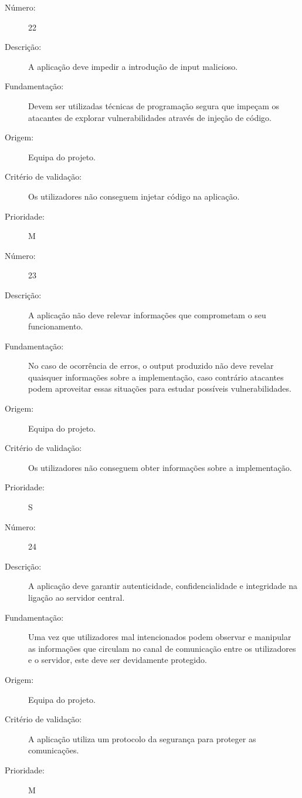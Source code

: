 \documentclass[12pt,a4paper]{article}
\begin{document}
            \begin{description}
        \item[Número:]22
        \item[Descrição:]A aplicação deve impedir a introdução de input malicioso.
        \item[Fundamentação:]Devem ser utilizadas técnicas de programação segura que impeçam os atacantes de explorar vulnerabilidades através de injeção de código.
        \item[Origem:]Equipa do projeto.
        \item[Critério de validação:]Os utilizadores não conseguem injetar código na aplicação.
        \item[Prioridade:]M
      \end{description}

      \vspace{0.5cm}

            \begin{description}
        \item[Número:]23
        \item[Descrição:]A aplicação não deve relevar informações que comprometam o seu funcionamento.
        \item[Fundamentação:]No caso de ocorrência de erros, o output produzido não deve revelar  quaisquer informações sobre a implementação, caso contrário atacantes podem aproveitar essas situações para estudar possíveis vulnerabilidades.
        \item[Origem:]Equipa do projeto.
        \item[Critério de validação:]Os utilizadores não conseguem obter informações sobre a implementação.
        \item[Prioridade:]S
      \end{description}
      \vspace{0.5cm}

            \begin{description}
        \item[Número:]24
        \item[Descrição:]A aplicação deve garantir autenticidade, confidencialidade e integridade na ligação ao servidor central.
        \item[Fundamentação:]Uma vez que utilizadores mal intencionados podem observar e manipular as informações que circulam no canal de comunicação entre os utilizadores e o servidor, este deve ser devidamente protegido.
        \item[Origem:] Equipa do projeto.
        \item[Critério de validação:]A aplicação utiliza um protocolo da segurança para proteger as comunicações.
        \item[Prioridade:]M
      \end{description}
\end{document}
